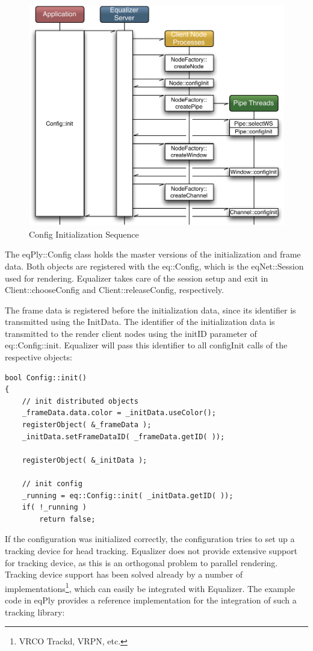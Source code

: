\documentclass[10pt,a4]{scrartcl}
\begin{document}
\begin{figure}
  \includegraphics[width=.6\textwidth]{images/configInit.pdf}
  {\caption{\small\label{fConfigInit}Config Initialization Sequence}}
\end{figure}
The \textsf{eqPly::Config} class holds the master versions of the
initialization and frame data. Both objects are registered with the
\textsf{eq::Config}, which is the \textsf{eqNet::Session} used for
rendering. Equalizer takes care of the session setup and exit in
\textsf{Client::choose\-Config} and \textsf{Client::releaseConfig},
respectively.

The frame data is registered before the initialization data, since its
identifier is transmitted using the \textsf{InitData}. The identifier of
the initialization data is transmitted to the render client nodes using
the \textsf{initID} parameter of \textsf{eq::Config::init}. Equalizer
will pass this identifier to all \textsf{configInit} calls of the
respective objects:

{\footnotesize\begin{lstlisting}
bool Config::init()
{
    // init distributed objects
    _frameData.data.color = _initData.useColor();
    registerObject( &_frameData );
    _initData.setFrameDataID( _frameData.getID( ));

    registerObject( &_initData );

    // init config
    _running = eq::Config::init( _initData.getID( ));
    if( !_running )
        return false;
\end{lstlisting}}

If the configuration was initialized correctly, the configuration tries
to set up a tracking device for head tracking. Equalizer does not
provide extensive support for tracking device, as this is an orthogonal
problem to parallel rendering. Tracking device support has been solved
already by a number of implementations\footnote{VRCO Trackd, VRPN,
  etc.}, which can easily be integrated with Equalizer. The example code
in \textsf{eqPly} provides a reference implementation for the integration of
such a tracking library:
\end{document}
